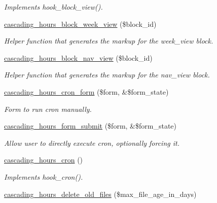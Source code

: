 \begin{DoxyCompactItemize}
\begin{DoxyCompactList}\small\item\em Implements hook\+\_\+block\+\_\+view(). \end{DoxyCompactList}\item 
\hyperlink{cascading__hours_8module_ab4183086296a2048c8195bc1b476c9a3_ab4183086296a2048c8195bc1b476c9a3}{cascading\+\_\+hours\+\_\+block\+\_\+week\+\_\+view} (\$block\+\_\+id)
\begin{DoxyCompactList}\small\item\em Helper function that generates the markup for the week\+\_\+view block. \end{DoxyCompactList}\item 
\hyperlink{cascading__hours_8module_ab15ff5d4e3e188a0a108ee91d5dd2633_ab15ff5d4e3e188a0a108ee91d5dd2633}{cascading\+\_\+hours\+\_\+block\+\_\+nav\+\_\+view} (\$block\+\_\+id)
\begin{DoxyCompactList}\small\item\em Helper function that generates the markup for the nav\+\_\+view block. \end{DoxyCompactList}\item 
\hyperlink{cascading__hours_8module_a4c09cc9b40ef85941a87e7c559787817_a4c09cc9b40ef85941a87e7c559787817}{cascading\+\_\+hours\+\_\+cron\+\_\+form} (\$form, \&\$form\+\_\+state)
\begin{DoxyCompactList}\small\item\em Form to run cron manually. \end{DoxyCompactList}\item 
\hyperlink{cascading__hours_8module_adb3cde4f8150586f9a97b429e9b35a62_adb3cde4f8150586f9a97b429e9b35a62}{cascading\+\_\+hours\+\_\+form\+\_\+submit} (\$form, \&\$form\+\_\+state)
\begin{DoxyCompactList}\small\item\em Allow user to directly execute cron, optionally forcing it. \end{DoxyCompactList}\item 
\hyperlink{cascading__hours_8module_a08fcb8f738c8a45e9ba0438b0d01ad5b_a08fcb8f738c8a45e9ba0438b0d01ad5b}{cascading\+\_\+hours\+\_\+cron} ()
\begin{DoxyCompactList}\small\item\em Implements hook\+\_\+cron(). \end{DoxyCompactList}\item 
\hyperlink{cascading__hours_8module_a7261bdad3d50c48e9aab304d9e669238_a7261bdad3d50c48e9aab304d9e669238}{cascading\+\_\+hours\+\_\+delete\+\_\+old\+\_\+files} (\$max\+\_\+file\+\_\+age\+\_\+in\+\_\+days)

\end{DoxyCompactItemize}
